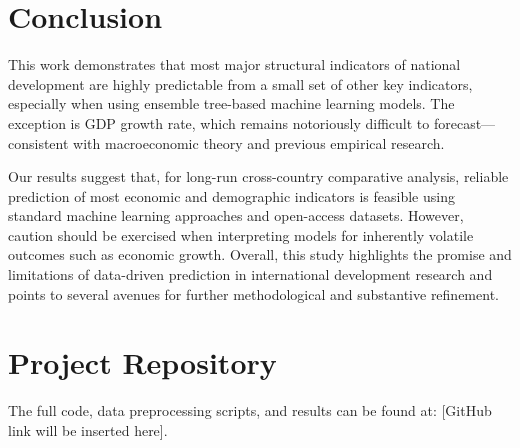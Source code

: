 \documentclass[12pt]{article}
\begin{document}
\section{Conclusion}

This work demonstrates that most major structural indicators of national development are highly predictable from a small set of other key indicators, especially when using ensemble tree-based machine learning models. The exception is GDP growth rate, which remains notoriously difficult to forecast—consistent with macroeconomic theory and previous empirical research.

Our results suggest that, for long-run cross-country comparative analysis, reliable prediction of most economic and demographic indicators is feasible using standard machine learning approaches and open-access datasets. However, caution should be exercised when interpreting models for inherently volatile outcomes such as economic growth. Overall, this study highlights the promise and limitations of data-driven prediction in international development research and points to several avenues for further methodological and substantive refinement.


\section*{Project Repository}
The full code, data preprocessing scripts, and results can be found at: [GitHub link will be inserted here].





\end{document}
